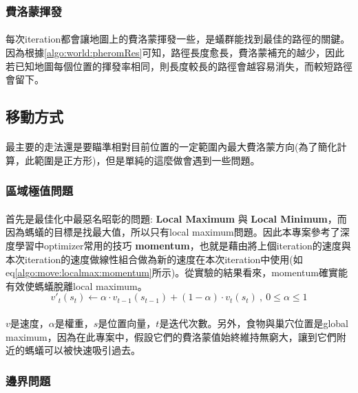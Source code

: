 \documentclass[]{article}
\begin{document}
\subsubsection{費洛蒙揮發}
\label{algo:world:pheromEvap}
\paragraph{}
每次iteration都會讓地圖上的費洛蒙揮發一些，是蟻群能找到最佳的路徑的關鍵。因為根據\ref{algo:world:pheromRes}可知，路徑長度愈長，費洛蒙補充的越少，因此若已知地圖每個位置的揮發率相同，則長度較長的路徑會越容易消失，而較短路徑會留下。

\subsection{移動方式}
\label{algo:move}
\paragraph{}
最主要的走法還是要瞄準相對目前位置的一定範圍內最大費洛蒙方向(為了簡化計算，此範圍是正方形)，但是單純的這麼做會遇到一些問題。
\subsubsection{區域極值問題}
\label{algo:move:localmax}
\paragraph{}
首先是最佳化中最惡名昭彰的問題: \textbf{Local Maximum} 與 \textbf{Local Minimum}，而因為螞蟻的目標是找最大值，所以只有local maximum問題。因此本專案參考了深度學習中optimizer常用的技巧 \textbf{momentum}，也就是藉由將上個iteration的速度與本次iteration的速度做線性組合做為新的速度在本次iteration中使用(如eq\eqref{algo:move:localmax:momentum}所示)。從實驗的結果看來，momentum確實能有效使螞蟻脫離local maximum。
\begin{equation}\label{algo:move:localmax:momentum}
	v'_{t}(s_{t}) \leftarrow \alpha \cdot v_{t-1}(s_{t-1}) + (1 - \alpha) \cdot v_{t}(s_{t}) \ , \ 0 \leq \alpha \leq 1
\end{equation}
\paragraph{}
$v$是速度，$\alpha$是權重，$s$是位置向量，$t$是迭代次數。另外，食物與巢穴位置是global maximum，因為在此專案中，假設它們的費洛蒙值始終維持無窮大，讓到它們附近的螞蟻可以被快速吸引過去。
\subsubsection{邊界問題}
\label{algo:move:boundary}
\end{document}
